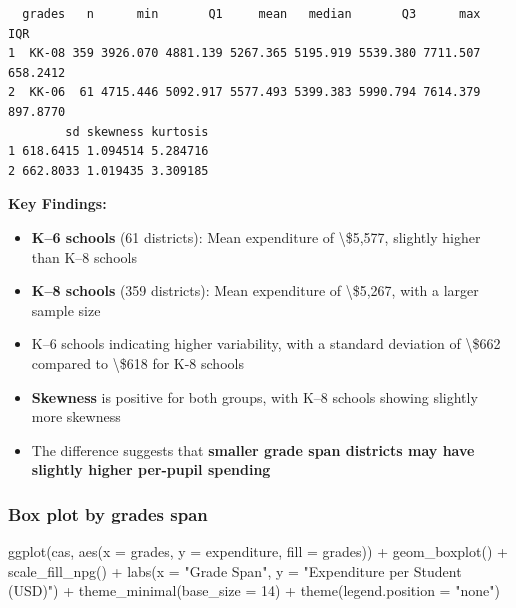 \documentclass[
  12pt,
  letterpaper,
]{scrbook}
\newenvironment{Shaded}{\begin{snugshade}}{\end{snugshade}}
\newcommand{\AttributeTok}[1]{\textcolor[rgb]{0.40,0.45,0.13}{#1}}
\newcommand{\DecValTok}[1]{\textcolor[rgb]{0.68,0.00,0.00}{#1}}
\newcommand{\FunctionTok}[1]{\textcolor[rgb]{0.28,0.35,0.67}{#1}}
\newcommand{\NormalTok}[1]{\textcolor[rgb]{0.00,0.23,0.31}{#1}}
\newcommand{\SpecialCharTok}[1]{\textcolor[rgb]{0.37,0.37,0.37}{#1}}
\newcommand{\StringTok}[1]{\textcolor[rgb]{0.13,0.47,0.30}{#1}}
\providecommand{\tightlist}{%
  \setlength{\itemsep}{0pt}\setlength{\parskip}{0pt}}
\renewcommand{\tightlist}{\setlength{\itemsep}{0.5\baselineskip}\setlength{\parskip}{0.2\baselineskip}}
\theoremstyle{plain}
\theoremstyle{definition}
\theoremstyle{remark}
\begin{document}
\begin{verbatim}
  grades   n      min       Q1     mean   median       Q3      max      IQR
1  KK-08 359 3926.070 4881.139 5267.365 5195.919 5539.380 7711.507 658.2412
2  KK-06  61 4715.446 5092.917 5577.493 5399.383 5990.794 7614.379 897.8770
        sd skewness kurtosis
1 618.6415 1.094514 5.284716
2 662.8033 1.019435 3.309185
\end{verbatim}

\textbf{Key Findings:}

\begin{itemize}
\tightlist
\item
  \textbf{K--6 schools} (61 districts): Mean expenditure of
  \textbackslash\$5,577, slightly higher than K--8 schools
\item
  \textbf{K--8 schools} (359 districts): Mean expenditure of
  \textbackslash\$5,267, with a larger sample size
\item
  K--6 schools indicating higher variability, with a standard deviation
  of \textbackslash\$662 compared to \textbackslash\$618 for K-8 schools
\item
  \textbf{Skewness} is positive for both groups, with K--8 schools
  showing slightly more skewness
\item
  The difference suggests that \textbf{smaller grade span districts may
  have slightly higher per-pupil spending}
\end{itemize}

\subsubsection{Box plot by grades span}\label{box-plot-by-grades-span}

\begin{Shaded}
\begin{Highlighting}[]
\FunctionTok{ggplot}\NormalTok{(cas, }\FunctionTok{aes}\NormalTok{(}\AttributeTok{x =}\NormalTok{ grades, }\AttributeTok{y =}\NormalTok{ expenditure, }\AttributeTok{fill =}\NormalTok{ grades)) }\SpecialCharTok{+}
  \FunctionTok{geom\_boxplot}\NormalTok{() }\SpecialCharTok{+}
  \FunctionTok{scale\_fill\_npg}\NormalTok{() }\SpecialCharTok{+}
  \FunctionTok{labs}\NormalTok{(}\AttributeTok{x =} \StringTok{"Grade Span"}\NormalTok{,}
       \AttributeTok{y =} \StringTok{"Expenditure per Student (USD)"}\NormalTok{) }\SpecialCharTok{+}
  \FunctionTok{theme\_minimal}\NormalTok{(}\AttributeTok{base\_size =} \DecValTok{14}\NormalTok{) }\SpecialCharTok{+}
  \FunctionTok{theme}\NormalTok{(}\AttributeTok{legend.position =} \StringTok{"none"}\NormalTok{)}
\end{Highlighting}
\end{Shaded}
\end{document}

